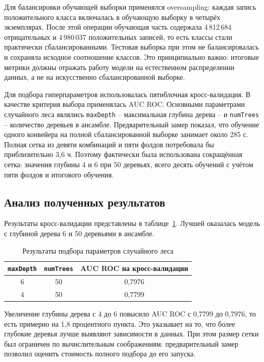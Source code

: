 Для балансировки обучающей выборки применялся oversampling: каждая запись положительного класса включалась в обучающую выборку в четырёх экземплярах. После этой операции обучающая часть содержала 4\,812\,684 отрицательных и 4\,980\,037 положительных записей, то есть классы стали практически сбалансированными. Тестовая выборка при этом не балансировалась и сохраняла исходное соотношение классов. Это принципиально важно: итоговые метрики должны отражать работу модели на естественном распределении данных, а не на искусственно сбалансированной выборке.

Для подбора гиперпараметров использовалась пятиблочная кросс-валидация. В качестве критерия выбора применялась AUC ROC. Основными параметрами случайного леса являлись \texttt{maxDepth} -- максимальная глубина дерева -- и \texttt{numTrees} -- количество деревьев в ансамбле. Предварительный замер показал, что обучение одного конвейера на полной сбалансированной выборке занимает около 285 с. Полная сетка из девяти комбинаций и пяти фолдов потребовала бы приблизительно 3,6 ч. Поэтому фактически была использована сокращённая сетка: значения глубины 4 и 6 при 50 деревьях, всего десять обучений с учётом пяти фолдов и итогового обучения.

\vspace{\baselineskip}\subsection{Анализ полученных результатов}\vspace{\baselineskip}

Результаты кросс-валидации представлены в таблице~\ref{tab:rf-cv}. Лучшей оказалась модель с глубиной дерева 6 и 50 деревьями в ансамбле.

\begin{table}[H]
    \centering
    \caption{Результаты подбора параметров случайного леса}
    \label{tab:rf-cv}
    \small
    \begin{tabular}{|c|c|c|}
        \hline
        \centering\arraybackslash \texttt{maxDepth} & \centering\arraybackslash \texttt{numTrees} & \centering\arraybackslash AUC ROC на кросс-валидации \\
        \hline
        6 & 50 & 0,7976 \\
        \hline
        4 & 50 & 0,7799 \\
        \hline
    \end{tabular}
\end{table}

Увеличение глубины дерева с 4 до 6 повысило AUC ROC с 0,7799 до 0,7976, то есть примерно на 1,8 процентного пункта. Это указывает на то, что более глубокие деревья лучше выявляют зависимости в данных. При этом размер сетки был ограничен по вычислительным соображениям: предварительный замер позволил оценить стоимость полного подбора до его запуска.

